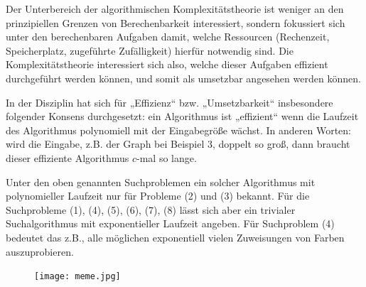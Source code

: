 Der Unterbereich der algorithmischen Komplexitätstheorie ist weniger an den prinzipiellen Grenzen von Berechenbarkeit interessiert, sondern fokussiert sich unter den berechenbaren Aufgaben damit, welche Ressourcen (Rechenzeit, Speicherplatz, zugeführte Zufälligkeit) hierfür notwendig sind. Die Komplexitätstheorie interessiert sich also, welche dieser Aufgaben effizient durchgeführt werden können, und somit als umsetzbar angesehen werden können. 

In der Disziplin hat sich für „Effizienz“ bzw. „Umsetzbarkeit“ insbesondere folgender Konsens durchgesetzt: ein Algorithmus ist „effizient“ wenn die Laufzeit des Algorithmus polynomiell mit der Eingabegröße wächst. In anderen Worten: wird die Eingabe, z.B. der Graph bei Beispiel 3, doppelt so groß, dann braucht dieser effiziente Algorithmus $c$-mal so lange.

Unter den oben genannten Suchproblemen ein solcher Algorithmus mit polynomieller Laufzeit nur für Probleme (2) und (3) bekannt.
Für die Suchprobleme (1), (4), (5), (6), (7), (8) lässt sich aber ein trivialer Suchalgorithmus mit exponentieller Laufzeit angeben. Für Suchproblem (4) bedeutet das z.B., alle möglichen exponentiell vielen Zuweisungen von Farben auszuprobieren.

\begin{figure}
    \centering
    \texttt{[image: meme.jpg]}
\caption{}\label{fig:meme}
\end{figure}

